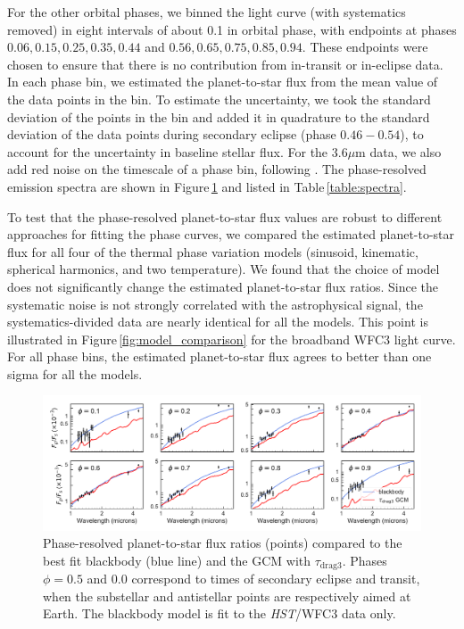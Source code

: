 \documentclass[twocolumn]{aastex61}
\newcommand{\project}[1]{\textsl{#1}}
\newcommand{\HST}{\project{HST}}
\begin{document}
For the other orbital phases, we binned the light curve (with systematics removed) in eight intervals of about 0.1 in orbital phase, with endpoints at phases $0.06, 0.15, 0.25, 0.35, 0.44$ and $0.56, 0.65, 0.75, 0.85, 0.94$. These endpoints were chosen to ensure that there is no contribution from in-transit or in-eclipse data.  In each phase bin, we estimated the planet-to-star flux from the mean value of the data points in the bin. To estimate the uncertainty, we took the standard deviation of the points in the bin and added it in quadrature to the standard deviation of the data points during secondary eclipse (phase $0.46-0.54$), to account for the uncertainty in baseline stellar flux.  For the $3.6\mu$m data, we also add red noise on the timescale of a phase bin, following \cite{pont06}.  The phase-resolved emission spectra are shown in Figure\,\ref{fig:spectra} and listed in Table\,\ref{table:spectra}. 

To test that the phase-resolved planet-to-star flux values are robust to different approaches for fitting the phase curves, we compared the estimated planet-to-star flux for all four of the thermal phase variation models (sinusoid, kinematic, spherical harmonics, and two temperature). We found that the choice of model does not significantly change the estimated planet-to-star flux ratios.  Since the systematic noise is not strongly correlated with the astrophysical signal, the systematics-divided data are nearly identical for all the models.  This point is illustrated in Figure\,\ref{fig:model_comparison} for the broadband WFC3 light curve. For all phase bins, the estimated planet-to-star flux agrees to better than one sigma for all the models.

\begin{figure}
\includegraphics[width = 1.0\textwidth]{Figures/emission_spectra.pdf}
\caption{Phase-resolved planet-to-star flux ratios (points) compared to the best fit blackbody (blue line) and the GCM with $\tau_\mathrm{drag3}$. Phases $\phi=0.5$ and $0.0$ correspond to times of secondary eclipse and transit, when the substellar and antistellar points are respectively aimed at Earth. The blackbody model is fit to the \HST/WFC3 data only.}
\label{fig:spectra}
\end{figure}
\end{document}

